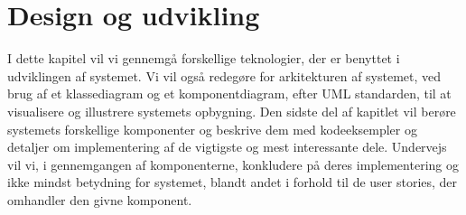 \chapter{Design og udvikling}
I dette kapitel vil vi gennemgå forskellige teknologier, der er benyttet i udviklingen af systemet.
Vi vil også redegøre for arkitekturen af systemet, ved brug af et klassediagram og et komponentdiagram, efter UML standarden, til at visualisere og illustrere systemets opbygning.
Den sidste del af kapitlet vil berøre systemets forskellige komponenter og beskrive dem med kodeeksempler og detaljer om implementering af de vigtigste og mest interessante dele. 
Undervejs vil vi, i gennemgangen af komponenterne, konkludere på deres implementering og ikke mindst betydning for systemet, blandt andet i forhold til de user stories, der omhandler den givne komponent.



\newpage







